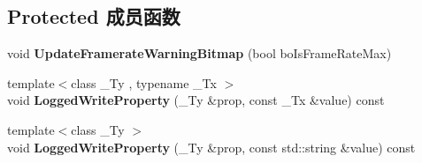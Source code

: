 \subsection*{Protected 成员函数}
\begin{DoxyCompactItemize}
\item 
\hypertarget{class_wizard_quick_setup_a1b85c0ab98e96b9c52195c4d4b6a0fed}{void {\bfseries Update\+Framerate\+Warning\+Bitmap} (bool bo\+Is\+Frame\+Rate\+Max)}\label{class_wizard_quick_setup_a1b85c0ab98e96b9c52195c4d4b6a0fed}

\item 
\hypertarget{class_wizard_quick_setup_a33cefdb686d12e9f309e0d250b27ced8}{{\footnotesize template$<$class \+\_\+\+Ty , typename \+\_\+\+Tx $>$ }\\void {\bfseries Logged\+Write\+Property} (\+\_\+\+Ty \&prop, const \+\_\+\+Tx \&value) const }\label{class_wizard_quick_setup_a33cefdb686d12e9f309e0d250b27ced8}

\item 
\hypertarget{class_wizard_quick_setup_a48593419f8f0ae3213d4bbd68d35d994}{{\footnotesize template$<$class \+\_\+\+Ty $>$ }\\void {\bfseries Logged\+Write\+Property} (\+\_\+\+Ty \&prop, const std\+::string \&value) const }\label{class_wizard_quick_setup_a48593419f8f0ae3213d4bbd68d35d994}

\end{DoxyCompactItemize}
